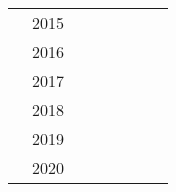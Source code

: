 \begin{center}
\begin{xltabular}{\textwidth}{llXlllll}
                            &  2015                 &                                   &             &                &                             &         &  \\
                            &  2016                 &                                   &             &                &                             &         &  \\
                            &  2017                 &                                   &             &                &                             &         &  \\
                            &  2018                 &                                   &             &                &                             &         &  \\
                            &  2019                 &                                   &             &                &                             &         &  \\
                            &  2020                 &                                   &             &                &                             &         &  \\





\end{xltabular}
\end{center}
